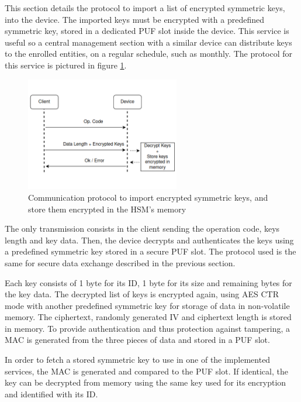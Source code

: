 This section details the protocol to import a list of encrypted symmetric keys, into the device.
The imported keys must be encrypted with a predefined symmetric key, stored in a dedicated PUF slot inside the device. This service is useful so a central management section with a similar device can distribute keys to the enrolled entities, on a regular schedule, such as monthly.
The protocol for this service is pictured in figure \ref{fig:protocol:import-keys}.

\begin{figure}[h!]
	\centering
	\includegraphics[width=0.60\textwidth]{./Images/import-keys.png}
	\caption{Communication protocol to import encrypted symmetric keys, and store them encrypted in the HSM's memory}
	\label{fig:protocol:import-keys}
\end{figure}

The only transmission consists in the client sending the operation code, keys length and key data.
Then, the device decrypts and authenticates the keys using a predefined symmetric key stored in a secure PUF slot. The protocol used is the same for secure data exchange described in the previous section.

Each key consists of 1 byte for its ID, 1 byte for its size and remaining bytes for the key data.
The decrypted list of keys is encrypted again, using \ac{AES} \ac{CTR} mode with another predefined symmetric key for storage of data in non-volatile memory. The ciphertext, randomly generated IV and ciphertext length is stored in memory. To provide authentication and thus protection against tampering, a \ac{MAC} is generated from the three pieces of data and stored in a PUF slot.

In order to fetch a stored symmetric key to use in one of the implemented services, the \ac{MAC} is generated and compared to the PUF slot. If identical, the key can be decrypted from memory using the same key used for its encryption and identified with its ID.

